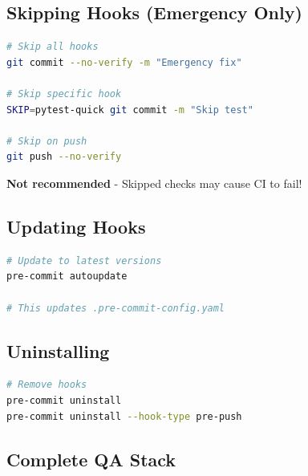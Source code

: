 \subsection{Skipping Hooks (Emergency Only)}\label{cr:app:archive-pre-commit-setup-summary:skipping-hooks-emergency-only}

\begin{record}

\begin{lstlisting}[language=bash]
# Skip all hooks
git commit --no-verify -m "Emergency fix"

# Skip specific hook
SKIP=pytest-quick git commit -m "Skip test"

# Skip on push
git push --no-verify
\end{lstlisting}

\warn{} \textbf{Not recommended} - Skipped checks may cause CI to fail!

\end{record}

\subsection{Updating Hooks}\label{cr:app:archive-pre-commit-setup-summary:updating-hooks}

\begin{record}

\begin{lstlisting}[language=bash]
# Update to latest versions
pre-commit autoupdate

# This updates .pre-commit-config.yaml
\end{lstlisting}

\end{record}

\subsection{Uninstalling}\label{cr:app:archive-pre-commit-setup-summary:uninstalling}

\begin{record}

\begin{lstlisting}[language=bash]
# Remove hooks
pre-commit uninstall
pre-commit uninstall --hook-type pre-push
\end{lstlisting}

\end{record}

\subsection{Complete QA Stack}\label{cr:app:archive-pre-commit-setup-summary:complete-qa-stack}

